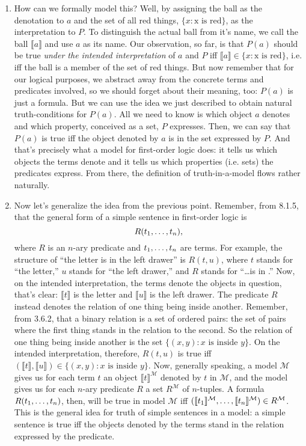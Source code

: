 \begin{enumerate}[\thesection.1]
	  \item How can we formally model this?
		Well, by assigning the ball as the denotation to $a$ and the set of all red things,
		$\{x:\text{x is red}\}$,
		as the interpretation to $P$.
		To distinguish the actual ball from it's name, we call the ball $\llbracket a\rrbracket$ and use $a$ as its name.
		Our observation, so far, is that $P(a)$ should be true \emph{under the intended interpretation} of $a$ and $P$ iff $\llbracket a\rrbracket\in\{x:\text{x is red}\}$, i.e. iff the ball is a member of the set of red things.
		But now remember that for our logical purposes, we abstract away from the concrete terms and predicates involved, so we should forget about their meaning, too: $P(a)$ is just a formula.
		But we can use the idea we just described to obtain natural truth-conditions for $P(a)$.
		All we need to know is which object $a$ denotes and which property, conceived as a set, $P$ expresses.
		Then, we can say that $P(a)$ is true iff the object denoted by $a$ is in the set expressed by $P$.
		And that's precisely what a model for first-order logic does: it tells us which objects the terms denote and it tells us which properties (i.e. sets) the predicates express.
		From there, the definition of truth-in-a-model flows rather naturally.
		
		\item Now let's generalize the idea from the previous point. Remember, from 8.1.5, that the general form of a simple sentence in first-order logic is \[R(t_1, \mathellipsis, t_n),\] where $R$ is an $n$-ary predicate and $t_1,\mathellipsis, t_n$ are terms. For example, the structure of ``the letter is in the left drawer'' is $R(t,u)$, where $t$ stands for ``the letter,'' $u$ stands for ``the left drawer,'' and $R$ stands for ``\dots is in \underline{\phantom{\dots}}.'' Now, on the intended interpretation, the terms denote the objects in question, that's clear: $\llbracket t\rrbracket$ is the letter and $\llbracket u\rrbracket$ is the left drawer. The predicate $R$ instead denotes the relation of one thing being inside another. Remember, from 3.6.2, that a binary relation is a set of ordered pairs: the set of pairs where the first thing stands in the relation to the second. So the relation of one thing being inside another is the set $\{(x,y):x\text{ is inside }y\}$. On the intended interpretation, therefore, $R(t,u)$ is true iff $(\llbracket t\rrbracket, \llbracket u\rrbracket)\in \{(x,y):x\text{ is inside }y\}$. Now, generally speaking, a model $\mathcal{M}$ gives us for each term $t$ an object $\llbracket t\rrbracket^\mathcal{M}$ denoted by $t$ in $\mathcal{M}$, and the model gives us for each $n$-ary predicate $R$ a set $R^\mathcal{M}$ of $n$-tuples. A formula $R(t_1, \mathellipsis, t_n)$, then, will be true in model $\mathcal{M}$ iff $(\llbracket t_1\rrbracket^\mathcal{M}, \mathellipsis, \llbracket t_n\rrbracket^\mathcal{M})\in R^\mathcal{M}$. This is the general idea for truth of simple sentences in a model: a simple sentence is true iff the objects denoted by the terms stand in the relation expressed by the predicate. 		
		

\end{enumerate}
